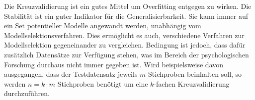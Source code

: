Die Kreuzvalidierung ist ein gutes Mittel um Overfitting entgegen zu wirken.
Die Stabilität ist ein guter Indikator für die Generalisierbarkeit. Sie kann immer auf ein Set potentieller Modelle angewandt werden, unabhängig vom Modellselektionsverfahren. Dies ermöglicht es auch, verschiedene Verfahren zur Modellselektion gegeneinander zu vergleichen.
Bedingung ist jedoch, dass dafür zusätzlich Datensätze zur Verfügung stehen, was im Bereich der psychologischen Forschung durchaus nicht immer gegeben ist.
Wird beispielsweise davon ausgegangen, dass der Testdatensatz jeweils $m$ Stichproben beinhalten soll, so werden $n = k \cdot m$ Stichproben benötigt um eine $k$-fachen Kreuzvalidierung durchzuführen.  